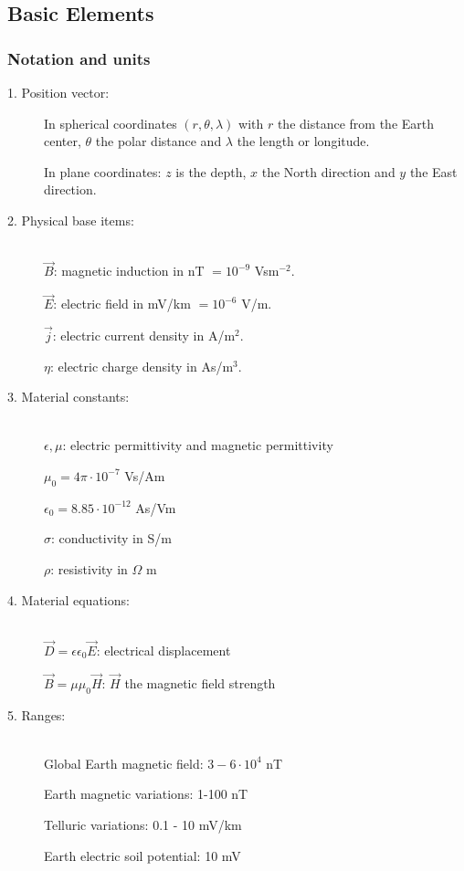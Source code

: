 \subsection{Basic Elements}
\subsubsection{Notation and units}
\begin{description}
\item[1. Position vector:] In spherical coordinates $(r,\theta,\lambda)$ with $r$ the distance from the Earth center, $\theta$ the polar distance and $\lambda$ the length or longitude.

In plane coordinates: $z$ is the depth, $x$ the North direction and $y$ the East direction.

\item[2. Physical base items:]~\\
$\vec{B}$: magnetic induction in nT $=10^{-9}$ Vsm$^{-2}$. 

$\vec{E}$: electric field in mV/km $=10^{-6}$ V/m.

$\vec{j}$: electric current density in A/m$^2$.

$\eta$: electric charge density in As/m$^3$.


\item[3. Material constants:] ~\\
$\epsilon,\mu$: electric permittivity and magnetic permittivity

$\mu_0=4\pi\cdot 10^{-7}$ Vs/Am

$\epsilon_0=8.85\cdot 10^{-12}$ As/Vm

$\sigma$: conductivity in S/m

$\rho$: resistivity in $\Omega$ m

\item[4. Material equations:]~\\

$\vec{D}=\epsilon\epsilon_0\vec{E}$: electrical displacement

$\vec{B}=\mu\mu_0\vec{H}$: $\vec{H}$ the magnetic field strength

\item[5. Ranges:]~\\

Global Earth magnetic field: $3-6\cdot 10^4$ nT 

Earth magnetic variations: 1-100 nT

Telluric variations: 0.1 - 10 mV/km

Earth electric soil potential: 10 mV
\end{description}

